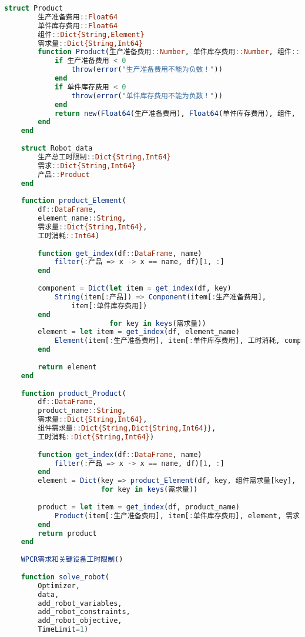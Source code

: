 \begin{appendices}
\begin{lstlisting}[language=julia]
    struct Product
        生产准备费用::Float64
        单件库存费用::Float64
        组件::Dict{String,Element}
        需求量::Dict{String,Int64}
        function Product(生产准备费用::Number, 单件库存费用::Number, 组件::Dict{String,Element}, 需求量::Dict{String,Int64})
            if 生产准备费用 < 0
                throw(error("生产准备费用不能为负数！"))
            end
            if 单件库存费用 < 0
                throw(error("单件库存费用不能为负数！"))
            end
            return new(Float64(生产准备费用), Float64(单件库存费用), 组件, 需求量)
        end
    end
    
    struct Robot_data
        生产总工时限制::Dict{String,Int64}
        需求::Dict{String,Int64}
        产品::Product
    end
    
    function product_Element(
        df::DataFrame,
        element_name::String,
        需求量::Dict{String,Int64},
        工时消耗::Int64)
    
        function get_index(df::DataFrame, name)
            filter(:产品 => x -> x == name, df)[1, :]
        end
    
        component = Dict(let item = get_index(df, key)
            String(item[:产品]) => Component(item[:生产准备费用],
                item[:单件库存费用])
        end
                         for key in keys(需求量))
        element = let item = get_index(df, element_name)
            Element(item[:生产准备费用], item[:单件库存费用], 工时消耗, component, 需求量)
        end
    
        return element
    end
    
    function product_Product(
        df::DataFrame,
        product_name::String,
        需求量::Dict{String,Int64},
        组件需求量::Dict{String,Dict{String,Int64}},
        工时消耗::Dict{String,Int64})
    
        function get_index(df::DataFrame, name)
            filter(:产品 => x -> x == name, df)[1, :]
        end
        element = Dict(key => product_Element(df, key, 组件需求量[key], 工时消耗[key])
                       for key in keys(需求量))
    
        product = let item = get_index(df, product_name)
            Product(item[:生产准备费用], item[:单件库存费用], element, 需求量)
        end
        return product
    end
    
    WPCR需求和关键设备工时限制()
    
    function solve_robot(
        Optimizer,
        data,
        add_robot_variables,
        add_robot_constraints,
        add_robot_objective,
        TimeLimit=1)
    

\end{lstlisting}
\end{appendices}
